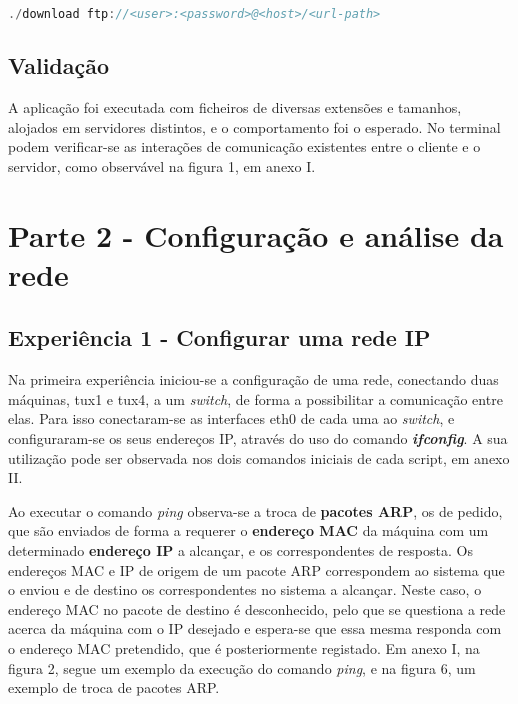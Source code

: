 \documentclass[a4paper, 11pt]{article}
\begin{document}
\begin{lstlisting}[language=C]
./download ftp://<user>:<password>@<host>/<url-path>
\end{lstlisting}

\subsection{Validação}

A aplicação foi executada com ficheiros de diversas extensões e tamanhos, alojados em servidores distintos, e o comportamento foi o esperado. No terminal podem verificar-se as interações de comunicação existentes entre o cliente e o servidor, como observável na figura 1, em anexo I.


\section{Parte 2 - Configuração e análise da rede}

\subsection{Experiência 1 - Configurar uma rede IP}

Na primeira experiência iniciou-se a configuração de uma rede, conectando duas máquinas, tux1 e tux4, a um \textit{switch}, de forma a possibilitar a comunicação entre elas. Para isso conectaram-se as interfaces eth0 de cada uma ao \textit{switch}, e configuraram-se os seus endereços IP, através do uso do comando \textit{\textbf{ifconfig}}. A sua utilização pode ser observada nos dois comandos iniciais de cada script, em anexo II.

Ao executar o comando \textit{ping} observa-se a troca de \textbf{pacotes ARP}, os de pedido, que são enviados de forma a requerer o \textbf{endereço MAC} da máquina com um determinado \textbf{endereço IP} a alcançar, e os correspondentes de resposta. Os endereços MAC e IP de origem de um pacote ARP correspondem ao sistema que o enviou e de destino os correspondentes no sistema a alcançar. Neste caso, o endereço MAC no pacote de destino é desconhecido, pelo que se questiona a rede acerca da máquina com o IP desejado e espera-se que essa mesma responda com o endereço MAC pretendido, que é posteriormente registado. Em anexo I, na figura 2, segue um exemplo da execução do comando \textit{ping}, e na figura 6, um exemplo de troca de pacotes ARP.
\end{document}
